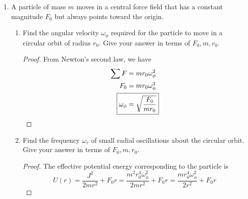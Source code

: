 \documentclass[../psets.tex]{subfiles}
\begin{document}
\begin{enumerate}
\begin{enumerate}
\begin{proof}
\begin{align*}
                &= \frac{J^2}{2m}\left[ \frac{2}{\ell}\cdot\frac{e\cos(\theta-\theta_0)+1}{\ell}+\frac{e^2-1}{\ell^2} \right]+V(u)\\
                &= \frac{J^2}{2m}\left[ \frac{2u}{\ell}-\frac{1}{b^2} \right]+V(u)\\
                &= \frac{J^2}{2m}\left[ \frac{2u}{\ell}-\frac{2m|E|}{J^2} \right]+V(u)\\
                &= \frac{J^2}{m}\cdot\frac{u}{\ell}-E+V(u)\\
                2E-\frac{J^2u}{m\ell} &= V(u)\\
                2E-\frac{k}{r} &= V(r)
            \end{align*}
            Therefore, we have that
            \begin{equation*}
                F = -\pdv{V}{r} = -\frac{|k|}{r^2}
            \end{equation*}
            as desired.
        \end{proof}
    \end{enumerate}
    \item A particle of mass $m$ moves in a central force field that has a constant magnitude $F_0$ but always points toward the origin.
    \begin{enumerate}
        \item Find the angular velocity $\omega_\phi$ required for the particle to move in a circular orbit of radius $r_0$. Give your answer in terms of $F_0,m,r_0$.
        \begin{proof}
            From Newton's second law, we have
            \begin{align*}
                \sum F &= mr_0\omega_\phi^2\\
                F_0 &= mr_0\omega_\phi^2\\
                \Aboxed{\omega_\phi &= \sqrt{\frac{F_0}{mr_0}}}
            \end{align*}
        \end{proof}
        \item Find the frequency $\omega_r$ of small radial oscillations about the circular orbit. Give your answer in terms of $F_0,m,r_0$.
        \begin{proof}
            The effective potential energy corresponding to the particle is
            \begin{equation*}
                U(r) = \frac{J^2}{2mr^2}+F_0r
                = \frac{m^2r_0^4\omega_\phi^2}{2mr^2}+F_0r
                = \frac{mr_0^4\omega_\phi^2}{2r^2}+F_0r

\end{equation*}
\end{proof}
\end{enumerate}
\end{enumerate}
\end{document}
